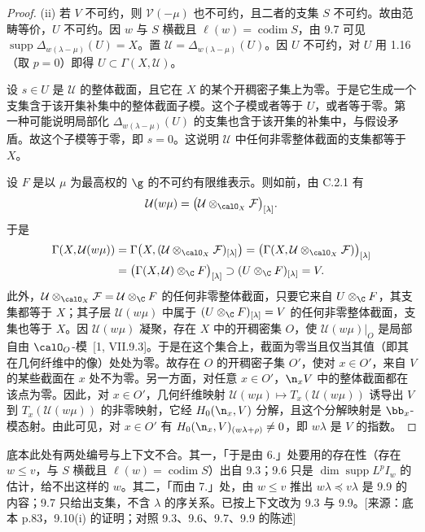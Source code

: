 \begin{proof}
(ii) 若 $V$ 不可约，则 $\mathcal{V}(-\mu)$ 也不可约，且二者的支集 $S$ 不可约。故由范畴等价，$U$ 不可约。因 $w$ 与 $S$ 横截且 $\ell(w)=\operatorname{codim}S$，由 9.7 可见 $\operatorname{supp}\Delta_{w(\lambda-\mu)}(U)=X$。置 $\mathcal{U}=\Delta_{w(\lambda-\mu)}(U)$。因 $U$ 不可约，对 $U$ 用 1.16（取 $p=0$）即得 $U\subset\Gamma(X,\mathcal{U})$。

设 $s\in U$ 是 $\mathcal{U}$ 的整体截面，且它在 $X$ 的某个开稠密子集上为零。于是它生成一个支集含于该开集补集中的整体截面子模。这个子模或者等于 $U$，或者等于零。第一种可能说明局部化 $\Delta_{w(\lambda-\mu)}(U)$ 的支集也含于该开集的补集中，与假设矛盾。故这个子模等于零，即 $s=0$。这说明 $\mathcal{U}$ 中任何非零整体截面的支集都等于 $X$。

设 $F$ 是以 $\mu$ 为最高权的 $\g$ 的不可约有限维表示。则如前，由 C.2.1 有
$$\mathcal{U}(w\mu)=\bigl(\mathcal{U}\otimes_{\calO_X}\mathcal{F}\bigr)_{[\lambda]}.$$
于是
{\small
\begin{align*}
\Gamma(X,\mathcal{U}(w\mu))&=\Gamma\bigl(X,(\mathcal{U}\otimes_{\calO_X}\mathcal{F})_{[\lambda]}\bigr)=\bigl(\Gamma(X,\mathcal{U}\otimes_{\calO_X}\mathcal{F})\bigr)_{[\lambda]}\\
&=\bigl(\Gamma(X,\mathcal{U})\otimes_\C F\bigr)_{[\lambda]}\supset(U\otimes_\C F)_{[\lambda]}=V.
\end{align*}}
此外，$\mathcal{U}\otimes_{\calO_X}\mathcal{F}=\mathcal{U}\otimes_\C F$ 的任何非零整体截面，只要它来自 $U\otimes_\C F$，其支集都等于 $X$；其子层 $\mathcal{U}(w\mu)$ 中属于 $(U\otimes_\C F)_{[\lambda]}=V$ 的任何非零整体截面，支集也等于 $X$。因 $\mathcal{U}(w\mu)$ 凝聚，存在 $X$ 中的开稠密集 $O$，使 $\mathcal{U}(w\mu)|_O$ 是局部自由 $\calO_O$-模~[1, VII.9.3]。于是在这个集合上，截面为零当且仅当其值（即其在几何纤维中的像）处处为零。故存在 $O$ 的开稠密子集 $O'$，使对 $x\in O'$，来自 $V$ 的某些截面在 $x$ 处不为零。另一方面，对任意 $x\in O'$，$\n_xV$ 中的整体截面都在该点为零。因此，对 $x\in O'$，几何纤维映射 $\mathcal{U}(w\mu)\mapsto T_x(\mathcal{U}(w\mu))$ 诱导出 $V$ 到 $T_x(\mathcal{U}(w\mu))$ 的非零映射，它经 $H_0(\n_x,V)$ 分解，且这个分解映射是 $\bb_x$-模态射。由此可见，对 $x\in O'$ 有 $H_0(\n_x,V)_{(w\lambda+\rho)}\ne 0$，即 $w\lambda$ 是 $V$ 的指数。
\end{proof}

\begin{annote}
底本此处有两处编号与上下文不合。其一，「于是由 6.」处要用的存在性（存在 $w\le v$，与 $S$ 横截且 $\ell(w)=\operatorname{codim}S$）出自 9.3；9.6 只是 $\dim\operatorname{supp}L^pI_w$ 的估计，给不出这样的 $w$。其二，「而由 7.」处，由 $w\le v$ 推出 $w\lambda\preccurlyeq v\lambda$ 是 9.9 的内容；9.7 只给出支集，不含 $\lambda$ 的序关系。已按上下文改为 9.3 与 9.9。[来源：底本 p.83，9.10(i) 的证明；对照 9.3、9.6、9.7、9.9 的陈述]
\end{annote}

